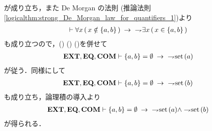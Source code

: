 \begin{sketch}
		が成り立ち，また De Morgan の法則
		(推論法則\ref{logicalthm:strong_De_Morgan_law_for_quantifiers_1})より
		\begin{align}
			\vdash \forall x\, (\, x \notin \{a,b\}\, ) \rarrow\ \negation \exists x\, (\, x \in \{a,b\}\, )
			\label{fom:classes_displayed_in_empty_pair_are_not_sets_3}
		\end{align}
		も成り立つので，()
		()
		()を併せて
		\begin{align}
			\EXTAX,\EQAX,\COMAX \vdash \{a,b\} = \emptyset \rarrow\ \negation \set{a}
		\end{align}
		が従う．同様にして
		\begin{align}
			\EXTAX,\EQAX,\COMAX \vdash \{a,b\} = \emptyset \rarrow\ \negation \set{b}
		\end{align}
		も成り立ち，論理積の導入より
		\begin{align}
			\EXTAX,\EQAX,\COMAX \vdash \{a,b\} = \emptyset \rarrow\ \negation \set{a} \wedge \negation \set{b}
		\end{align}
		が得られる．
		\QED
	\end{sketch}
